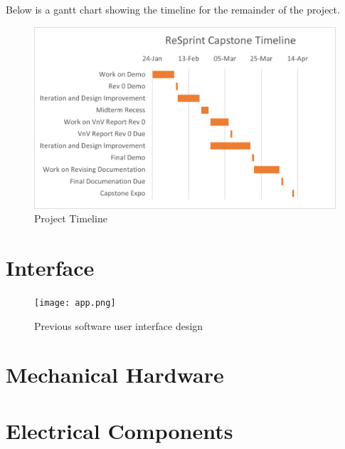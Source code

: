 \documentclass[12pt, titlepage]{article}
\begin{document}
Below is a gantt chart showing the timeline for the remainder of the project.

\begin{figure}[H]
\centerline{\includegraphics[scale=1]{gantt.png}}
\caption{Project Timeline}
\label{fig}
\end{figure}


% 

\newpage{}

\appendix

\section{Interface}
\label{Apx.A}

\begin{figure}[H]
\centerline{\texttt{[image: app.png]}}
\caption{Previous software user interface design}
\label{fig}
\end{figure}

\section{Mechanical Hardware}
\hfill

\section{Electrical Components}
\label{Apx.C}
\end{document}
